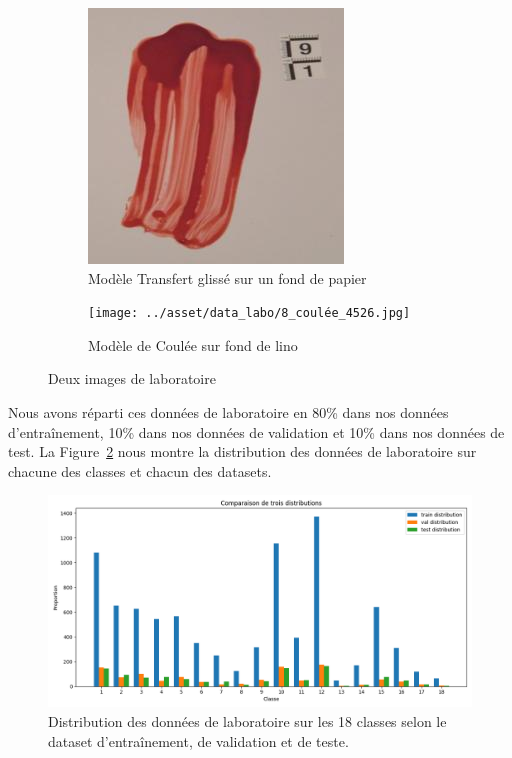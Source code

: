 \documentclass[a4paper]{article}
\begin{document}
\begin{figure}[ht]
    \centering
    \begin{subfigure}{0.40\linewidth}
        \centering
        \includegraphics[width=\linewidth]{../asset/data_labo/4_papier_1586.jpg}
        \caption{Modèle Transfert glissé sur un fond de papier}
    \end{subfigure}
    \begin{subfigure}{0.40\linewidth}
        \centering
        \texttt{[image: ../asset/data\_labo/8\_coulée\_4526.jpg]}
        \caption{Modèle de Coulée sur fond de lino}
    \end{subfigure}
    \caption{Deux images de laboratoire}
    \label{fig: labs images}
\end{figure}

Nous avons réparti ces données de laboratoire en 80\% dans nos données d'entraînement, 10\% dans nos données de validation et 10\% dans nos données de test. La Figure~\ref{fig:distribution labo} nous montre la distribution des données de laboratoire sur chacune des classes et chacun des datasets.

\begin{figure}[ht]
    \centering
    \includegraphics[width=0.8\linewidth]{../asset/distribution_train_val_test.png}
    \caption{Distribution des données de laboratoire sur les 18 classes selon le dataset d'entraînement, de validation et de teste.}
    \label{fig:distribution labo}
\end{figure}
\end{document}
